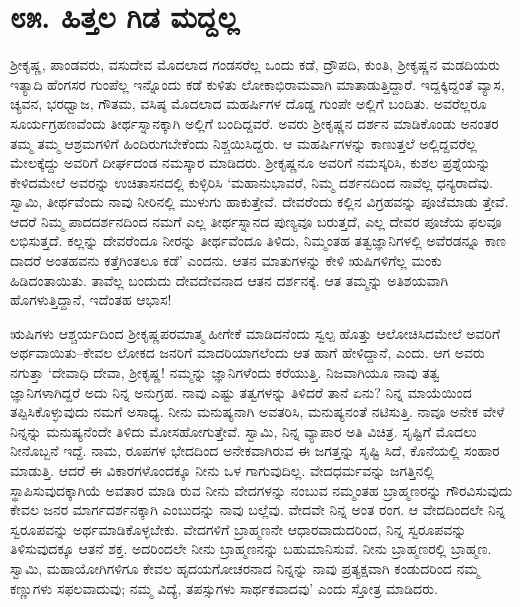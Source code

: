 
\chapter{೮೫. ಹಿತ್ತಲ ಗಿಡ ಮದ್ದಲ್ಲ}

ಶ್ರೀಕೃಷ್ಣ, ಪಾಂಡವರು, ವಸುದೇವ ಮೊದಲಾದ ಗಂಡಸರೆಲ್ಲ ಒಂದು ಕಡೆ, ದ್ರೌಪದಿ, ಕುಂತಿ, ಶ್ರೀಕೃಷ್ಣನ ಮಡದಿಯರು ಇತ್ಯಾದಿ ಹೆಂಗಸರ ಗುಂಪೆಲ್ಲ ಇನ್ನೊಂದು ಕಡೆ ಕುಳಿತು ಲೋಕಾಭಿರಾಮವಾಗಿ ಮಾತಾಡುತ್ತಿದ್ದಾರೆ. ಇದ್ದಕ್ಕಿದ್ದಂತೆ ವ್ಯಾಸ, ಚ್ಯವನ, ಭರಧ್ವಾಜ, ಗೌತಮ, ವಸಿಷ್ಠ ಮೊದಲಾದ ಮಹರ್ಷಿಗಳ ದೊಡ್ಡ ಗುಂಪೇ ಅಲ್ಲಿಗೆ ಬಂದಿತು. ಅವರೆಲ್ಲರೂ ಸೂರ್ಯಗ್ರಹಣವೆಂದು ತೀರ್ಥಸ್ನಾನಕ್ಕಾಗಿ ಅಲ್ಲಿಗೆ ಬಂದಿದ್ದವರೆ. ಅವರು ಶ್ರೀಕೃಷ್ಣನ ದರ್ಶನ ಮಾಡಿಕೊಂಡು ಅನಂತರ ತಮ್ಮ ತಮ್ಮ ಆಶ್ರಮಗಳಿಗೆ ಹಿಂದಿರುಗಬೇಕೆಂದು ನಿಶ್ಚಯಿಸಿದ್ದರು. ಆ ಮಹರ್ಷಿಗಳನ್ನು ಕಾಣುತ್ತಲೆ ಅಲ್ಲಿದ್ದವರೆಲ್ಲ ಮೇಲಕ್ಕೆದ್ದು ಅವರಿಗೆ ದೀರ್ಘದಂಡ ನಮಸ್ಕಾರ ಮಾಡಿದರು. ಶ್ರೀಕೃಷ್ಣನೂ ಅವರಿಗೆ ನಮಸ್ಕರಿಸಿ, ಕುಶಲ ಪ್ರಶ್ನೆಯನ್ನು ಕೇಳಿದಮೇಲೆ ಅವರನ್ನು ಉಚಿತಾಸನದಲ್ಲಿ ಕುಳ್ಳಿರಿಸಿ ‘ಮಹಾನುಭಾವರೆ, ನಿಮ್ಮ ದರ್ಶನದಿಂದ ನಾವೆಲ್ಲ ಧನ್ಯರಾದೆವು. ಸ್ವಾಮಿ, ತೀರ್ಥವೆಂದು ನಾವು ನೀರಿನಲ್ಲಿ ಮುಳುಗು ಹಾಕುತ್ತೇವೆ. ದೇವರೆಂದು ಕಲ್ಲಿನ ವಿಗ್ರಹವನ್ನು ಪೂಜೆಮಾಡು ತ್ತೇವೆ. ಆದರೆ ನಿಮ್ಮ ಪಾದದರ್ಶನದಿಂದ ನಮಗೆ ಎಲ್ಲ ತೀರ್ಥಸ್ನಾನದ ಪುಣ್ಯವೂ ಬರುತ್ತದೆ, ಎಲ್ಲ ದೇವರ ಪೂಜೆಯ ಫಲವೂ ಲಭಿಸುತ್ತದೆ. ಕಲ್ಲನ್ನು ದೇವರೆಂದೂ ನೀರನ್ನು ತೀರ್ಥವೆಂದೂ ತಿಳಿದು, ನಿಮ್ಮಂತಹ ತತ್ವಜ್ಞಾನಿಗಳಲ್ಲಿ ಅವೆರಡನ್ನೂ ಕಾಣ ದಾದರೆ ಅಂತಹವನು ಕತ್ತೆಗಿಂತಲೂ ಕಡೆ’ ಎಂದನು. ಆತನ ಮಾತುಗಳನ್ನು ಕೇಳಿ ಋಷಿಗಳಿಗೆಲ್ಲ ಮಂಕು ಹಿಡಿದಂತಾಯಿತು. ತಾವೆಲ್ಲ ಬಂದುದು ದೇವದೇವನಾದ ಆತನ ದರ್ಶನಕ್ಕೆ. ಆತ ತಮ್ಮನ್ನು ಅತಿಶಯವಾಗಿ ಹೊಗಳುತ್ತಿದ್ದಾನೆ, ಇದೆಂತಹ ಆಭಾಸ!

ಋಷಿಗಳು ಆಶ್ಚರ್ಯದಿಂದ ಶ್ರೀಕೃಷ್ಣಪರಮಾತ್ಮ ಹೀಗೇಕೆ ಮಾಡಿದನೆಂದು ಸ್ವಲ್ಪ ಹೊತ್ತು ಆಲೋಚಿಸಿದಮೇಲೆ ಅವರಿಗೆ ಅರ್ಥವಾಯಿತು–ಕೇವಲ ಲೋಕದ ಜನರಿಗೆ ಮಾದರಿಯಾಗಲೆಂದು ಆತ ಹಾಗೆ ಹೇಳಿದ್ದಾನೆ, ಎಂದು. ಆಗ ಅವರು ನಗುತ್ತಾ ‘ದೇವಾಧಿ ದೇವಾ, ಶ್ರೀಕೃಷ್ಣ! ನಮ್ಮನ್ನು ಜ್ಞಾನಿಗಳೆಂದು ಕರೆಯುತ್ತಿ. ನಿಜವಾಗಿಯೂ ನಾವು ತತ್ವ ಜ್ಞಾನಿಗಳಾಗಿದ್ದರೆ ಅದು ನಿನ್ನ ಅನುಗ್ರಹ. ನಾವು ಎಷ್ಟು ತತ್ವಗಳನ್ನು ತಿಳಿದರೆ ತಾನೆ ಏನು? ನಿನ್ನ ಮಾಯೆಯಿಂದ ತಪ್ಪಿಸಿಕೊಳ್ಳುವುದು ನಮಗೆ ಅಸಾಧ್ಯ. ನೀನು ಮನುಷ್ಯನಾಗಿ ಅವತರಿಸಿ, ಮನುಷ್ಯನಂತೆ ನಟಿಸುತ್ತಿ. ನಾವೂ ಅನೇಕ ವೇಳೆ ನಿನ್ನನ್ನು ಮನುಷ್ಯನೆಂದೇ ತಿಳಿದು ಮೋಸಹೋಗುತ್ತೇವೆ. ಸ್ವಾಮಿ, ನಿನ್ನ ವ್ಯಾಪಾರ ಅತಿ ವಿಚಿತ್ರ. ಸೃಷ್ಟಿಗೆ ಮೊದಲು ನೀನೊಬ್ಬನೆ ಇದ್ದೆ. ನಾಮ, ರೂಪಗಳ ಭೇದದಿಂದ ಅನೇಕವಾಗಿರುವ ಈ ಜಗತ್ತನ್ನು ಸೃಷ್ಟಿ ಸಿದೆ, ಕೊನೆಯಲ್ಲಿ ಸಂಹಾರ ಮಾಡುತ್ತಿ. ಆದರೆ ಈ ವಿಕಾರಗಳೊಂದಕ್ಕೂ ನೀನು ಒಳ ಗಾಗುವುದಿಲ್ಲ. ವೇದಧರ್ಮವನ್ನು ಜಗತ್ತಿನಲ್ಲಿ ಸ್ಥಾಪಿಸುವುದಕ್ಕಾಗಿಯೆ ಅವತಾರ ಮಾಡಿ ರುವ ನೀನು ವೇದಗಳನ್ನು ನಂಬುವ ನಮ್ಮಂತಹ ಬ್ರಾಹ್ಮಣರನ್ನು ಗೌರವಿಸುವುದು ಕೇವಲ ಜನರ ಮಾರ್ಗದರ್ಶನಕ್ಕಾಗಿ ಎಂಬುದನ್ನು ನಾವು ಬಲ್ಲೆವು. ವೇದವೇ ನಿನ್ನ ಅಂತ ರಂಗ. ಆ ವೇದದಿಂದಲೇ ನಿನ್ನ ಸ್ವರೂಪವನ್ನು ಅರ್ಥಮಾಡಿಕೊಳ್ಳಬೇಕು. ವೇದಗಳಿಗೆ ಬ್ರಾಹ್ಮಣನೇ ಆಧಾರವಾದುದರಿಂದ, ನಿನ್ನ ಸ್ವರೂಪವನ್ನು ತಿಳಿಸುವುದಕ್ಕೂ ಆತನೆ ಶಕ್ತ. ಅದರಿಂದಲೇ ನೀನು ಬ್ರಾಹ್ಮಣನನ್ನು ಬಹುಮಾನಿಸುವೆ. ನೀನು ಬ್ರಾಹ್ಮಣರಲ್ಲಿ ಬ್ರಾಹ್ಮಣ. ಸ್ವಾಮಿ, ಮಹಾಯೋಗಿಗಳಿಗೂ ಕೇವಲ ಹೃದಯಗೋಚರನಾದ ನಿನ್ನನ್ನು ನಾವು ಪ್ರತ್ಯಕ್ಷವಾಗಿ ಕಂಡುದರಿಂದ ನಮ್ಮ ಕಣ್ಣುಗಳು ಸಫಲವಾದುವು; ನಮ್ಮ ವಿದ್ಯೆ, ತಪಸ್ಸುಗಳು ಸಾರ್ಥಕವಾದವು’ ಎಂದು ಸ್ತೋತ್ರ ಮಾಡಿದರು.

